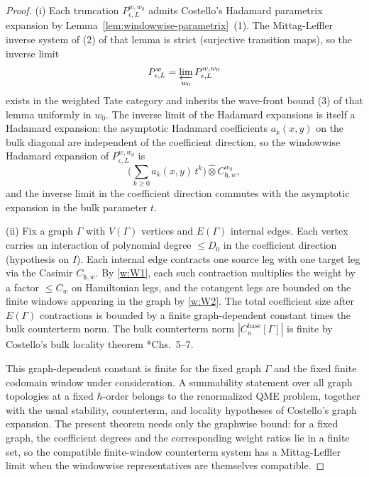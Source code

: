 \begin{proof}
  (i) Each truncation $P_{\epsilon,L}^{w,w_0}$ admits Costello's
  Hadamard parametrix expansion by
  Lemma~\ref{lem:windowwise-parametrix}~(1). The Mittag-Leffler
  inverse system of (2) of that lemma is strict (surjective
  transition maps), so the inverse limit
  \[
    P_{\epsilon,L}^{w}
      =\varprojlim_{w_0}P_{\epsilon,L}^{w,w_0}
  \]
  exists in the weighted Tate category and inherits the wave-front
  bound (3) of that lemma uniformly in $w_0$. The inverse limit of the
  Hadamard expansions is itself a Hadamard expansion: the
  asymptotic Hadamard coefficients $a_k(x,y)$ on the bulk diagonal
  are independent of the coefficient direction, so the windowwise
  Hadamard expansion of $P_{\epsilon,L}^{w,w_0}$ is
  \[
    \bigl(\sum_{k\geq0}a_k(x,y)\,t^k\bigr)\widehat\otimes
      C_{\mathfrak h,w}^{w_0},
  \]
  and the inverse limit in the
  coefficient direction commutes with the asymptotic expansion in
  the bulk parameter $t$.

  (ii) Fix a graph $\Gamma$ with $V(\Gamma)$ vertices and
  $E(\Gamma)$ internal edges. Each vertex carries an interaction of
  polynomial degree $\leq D_0$ in the coefficient direction
  (hypothesis on $I$). Each internal edge contracts one source leg
  with one target leg via the Casimir $C_{\mathfrak h,w}$. By
  \ref{w:W1}, each such contraction multiplies the weight by a factor
  $\leq C_w$ on Hamiltonian legs, and the cotangent legs are bounded
  on the finite windows appearing in the graph by
  \ref{w:W2}. The total coefficient size after $E(\Gamma)$
  contractions is bounded by a finite graph-dependent constant times
  the bulk counterterm norm. The
  bulk counterterm norm $|C_n^{\mathrm{base}}[\Gamma]|$ is finite by
  Costello's bulk locality theorem
  \cite{costello-renormalization}*{Chs.~5--7}.

  This graph-dependent constant is finite for the fixed graph
  \(\Gamma\) and the fixed finite codomain window under consideration.
  A summability statement over all graph topologies at a fixed
  \(\hbar\)-order belongs
  to the renormalized QME problem, together with the usual stability,
  counterterm, and locality hypotheses of Costello's graph expansion.
  The present theorem needs only the graphwise bound: for a fixed
  graph, the coefficient degrees and the corresponding weight ratios
  lie in a finite set, so the compatible finite-window counterterm
  system has a Mittag-Leffler limit when the windowwise representatives
  are themselves compatible.


\end{proof}
